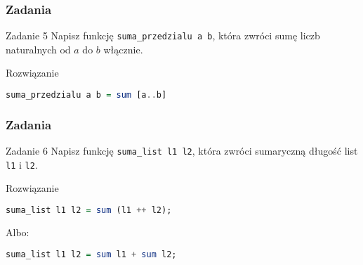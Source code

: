\begin{frame}[fragile]
  \frametitle{Zadania}
  \begin{block}{Zadanie 5}
    Napisz funkcję \texttt{suma\_przedzialu a b}, która zwróci sumę liczb
    naturalnych od $a$ do $b$ włącznie.
  \end{block}
  \vspace{1em}
  \pause

  \begin{block}{Rozwiązanie}
    \begin{lstlisting}[language=Haskell]
suma_przedzialu a b = sum [a..b]
    \end{lstlisting}
  \end{block}
\end{frame}

\begin{frame}[fragile]
  \frametitle{Zadania}
  \begin{block}{Zadanie 6}
    Napisz funkcję \texttt{suma\_list l1 l2}, która zwróci sumaryczną
    długość list \texttt{l1} i \texttt{l2}.
  \end{block}
  \vspace{1em}
  \pause

  \begin{block}{Rozwiązanie}
    \begin{lstlisting}[language=Haskell]
suma_list l1 l2 = sum (l1 ++ l2);
    \end{lstlisting}

    Albo:

    \begin{lstlisting}[language=Haskell]
suma_list l1 l2 = sum l1 + sum l2;
    \end{lstlisting}
  \end{block}
\end{frame}
